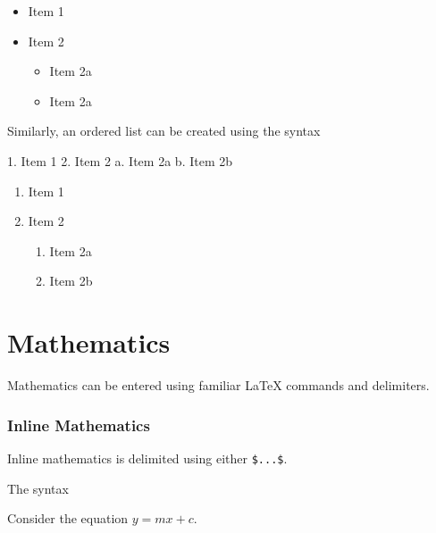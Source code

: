 \documentclass[
  letterpaper,
  oneside]{book}
\newenvironment{Shaded}{\begin{snugshade}}{\end{snugshade}}
\newcommand{\NormalTok}[1]{\textcolor[rgb]{0.00,0.23,0.31}{#1}}
\newcommand{\SpecialStringTok}[1]{\textcolor[rgb]{0.13,0.47,0.30}{#1}}
\providecommand{\tightlist}{%
  \setlength{\itemsep}{0pt}\setlength{\parskip}{0pt}}\usepackage{longtable,booktabs,array}
\numberwithin{equation}{section}
\numberwithin{figure}{section}
\theoremstyle{break}
\theoremstyle{plain}
\theoremstyle{remark}
\begin{document}
\begin{itemize}
\tightlist
\item
  Item 1
\item
  Item 2

  \begin{itemize}
  \tightlist
  \item
    Item 2a
  \item
    Item 2a
  \end{itemize}
\end{itemize}

Similarly, an ordered list can be created using the syntax

\begin{Shaded}
\begin{Highlighting}[]
\SpecialStringTok{1. }\NormalTok{Item 1}
\SpecialStringTok{2. }\NormalTok{Item 2}
\NormalTok{    a. Item 2a}
\NormalTok{    b. Item 2b}
\end{Highlighting}
\end{Shaded}

\begin{enumerate}
\def\labelenumi{\arabic{enumi}.}
\tightlist
\item
  Item 1
\item
  Item 2

  \begin{enumerate}
  \def\labelenumii{\alph{enumii}.}
  \tightlist
  \item
    Item 2a
  \item
    Item 2b
  \end{enumerate}
\end{enumerate}

\section{Mathematics}\label{mathematics}

Mathematics can be entered using familiar LaTeX commands and delimiters.

\subsubsection*{Inline Mathematics}\label{inline-mathematics}

Inline mathematics is delimited using either \texttt{\$...\$}.

The syntax

\begin{Shaded}
\begin{Highlighting}[]
\NormalTok{Consider the equation $y = mx+c$.}
\end{Highlighting}
\end{Shaded}
\end{document}
